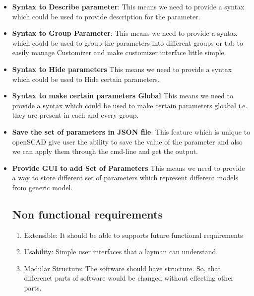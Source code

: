 \begin{itemize}
\begin{enumerate}
	\end{enumerate}
	\item {\bf Syntax to Describe parameter}: 
		This means we need to provide a syntax which could be used to provide description for the parameter.
	\item \textbf{Syntax to Group Parameter}:
		This means we need to provide a syntax which could be used to group the parameters into different groups or tab to easily manage Customizer and make customizer interface little simple.
	\item \textbf{Syntax to Hide parameters}
		This means we need to provide a syntax which could be used to Hide certain parameters.
	\item \textbf{Syntax to make certain parameters Global}
		This means we need to provide a syntax which could be used to make certain parameters gloabal i.e. they are present in each and every group.
	\item \textbf{Save the set of parameters in JSON file}:
	This feature which is unique to openSCAD give user the ability to save the value of the parameter and also we can apply them through the cmd-line and get the output.
	
	\item \textbf{Provide GUI to add Set of Parameters}
		This means we need to provide a way to store different set of parameters which represent different models from generic model.
	
	\subsection{Non functional requirements}
	\begin{enumerate} 
		\item Extensible: It should be able to supports future functional requirements
		\item Usability: Simple user interfaces that a layman can understand.
		\item Modular Structure: The software should have  structure. So, that differenet parts of software would be changed without effecting other parts.
		 
	\end{enumerate}
\end{itemize}
